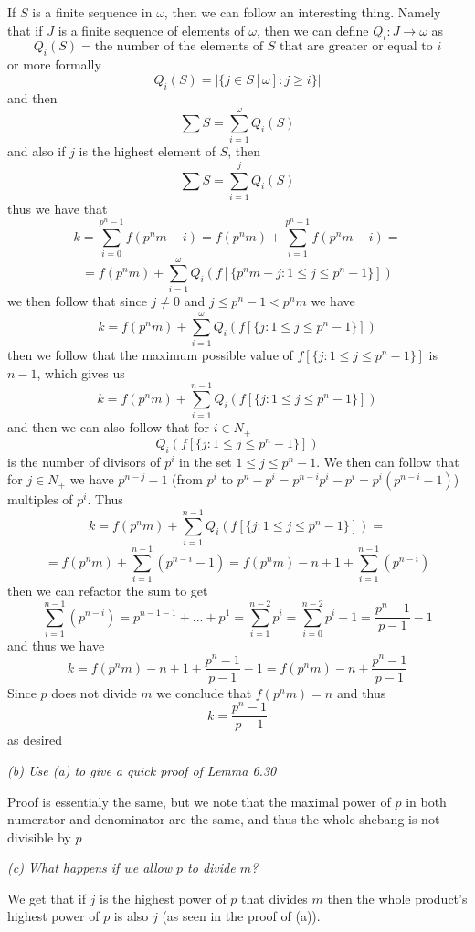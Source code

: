 \documentclass[11pt,oneside,titlepage]{book}
\newcommand{\set}[1]{\{ #1 \}}
\begin{document}
If $S$ is a finite sequence in $\omega$, then we can follow an
interesting thing.  Namely that if $J$ is a finite sequence of
elements of $\omega$, then we can define $Q_i: J \to \omega$ as
$$Q_i(S) = \text{the number of the elements of $S$ that are greater or equal to }i$$
or more formally
$$Q_i(S) = |\set{j \in S[\omega]: j \geq i}|$$
and then
$$\sum{S} = \sum_{i = 1}^{\omega}{Q_i(S)}$$
and also if $j$ is the highest element of $S$, then
$$\sum{S} = \sum_{i = 1}^{j}{Q_i(S)}$$
thus we have that
$$k = \sum_{i = 0}^{p^n - 1}{f(p^nm - i)} = f(p^nm) + \sum_{i = 1}^{p^n - 1}{f(p^nm - i)} =$$
$$ = f(p^nm) + \sum_{i = 1}^{\omega}{Q_i(f[\set{p^nm - j: 1 \leq j \leq p^n - 1}])}$$
we then follow that since $j \neq 0$ and $j \leq p^n - 1 < p^nm$ we have
$$k = f(p^nm) + \sum_{i = 1}^{\omega}{Q_i(f[\set{j: 1 \leq j \leq p^n - 1}])}$$
then we follow that the maximum possible value of $ f[\set{j: 1 \leq j \leq p^n - 1}]$
is $n - 1$, which gives us
$$k = f(p^nm) + \sum_{i = 1}^{n - 1}{Q_i(f[\set{j: 1 \leq j \leq p^n - 1}])}$$
and then we can also follow that for $i \in N_+$
$$Q_i(f[\set{j: 1 \leq j \leq p^n - 1}])$$
is the number of divisors of $p^i$ in the set $1 \leq j \leq p^n - 1$.
We then can follow that for $j \in N_+$ we have $p^{n - j} - 1$ (from
$p^{i}$ to $p^n - p^i = p^{n - i}p^i - p^i = p^i(p^{n - i} - 1)$)
multiples of $p^i$. Thus
$$k = f(p^nm) + \sum_{i = 1}^{n - 1}{Q_i(f[\set{j: 1 \leq j \leq p^n - 1}])} = $$
$$ = 
f(p^nm) + \sum_{i = 1}^{n - 1}{(p^{n - i} - 1)} = f(p^nm) - n + 1 + \sum_{i = 1}^{n - 1}{(p^{n - i})}$$
then we can refactor the sum to get
$$\sum_{i = 1}^{n - 1}{(p^{n - i})} = p^{n - 1 - 1} + ... + p^1 = \sum_{i = 1}^{n - 2}{p^i} =
\sum_{i = 0}^{n - 2}{p^i} - 1 = \frac{p^{n} - 1}{p - 1} - 1$$
and thus we have
$$k = f(p^nm) - n + 1 + \frac{p^{n} - 1}{p - 1} - 1
= f(p^nm) - n  + \frac{p^{n} - 1}{p - 1}$$
Since $p$ does not divide $m$ we conclude that $f(p^nm)  = n$ and thus
$$k = \frac{p^{n} - 1}{p - 1}$$
as desired

\textit{(b) Use (a) to give a quick proof of Lemma 6.30}

Proof is essentialy the same, but we note that the maximal power of
$p$ in both numerator and denominator are the same, and thus the whole
shebang is not divisible by $p$

\textit{(c) What happens if we allow $p$ to divide $m$?}

We get that if $j$ is the highest power of $p$ that divides $m$ then
the whole product's highest power of $p$ is also $j$ (as seen in the
proof of (a)).
\end{document}
